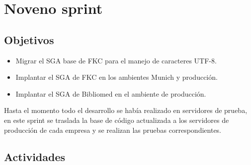 ﻿\section{Noveno sprint} %
\label{sec:noveno_sprint}

\subsection{Objetivos}

\begin{itemize}
	\item Migrar el SGA base de FKC para el manejo de caracteres UTF-8.
	\item Implantar el SGA de FKC en los ambientes Munich y producción.
	\item Implantar el SGA de Bibliomed en el ambiente de producción.
\end{itemize}

Hasta el momento todo el desarrollo se había realizado en servidores de prueba, en este sprint se traslada la base de código actualizada a los servidores de producción de cada empresa y se realizan las pruebas correspondientes.

\subsection{Actividades} %
\label{sub:actividades9}

